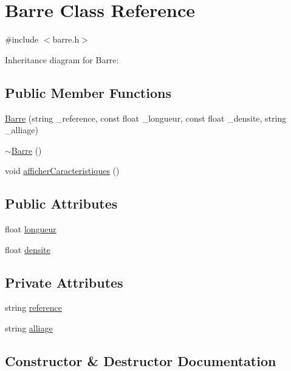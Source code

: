 \hypertarget{class_barre}{}\section{Barre Class Reference}
\label{class_barre}


{\ttfamily \#include $<$barre.\+h$>$}



Inheritance diagram for Barre\+:
\subsection*{Public Member Functions}
\begin{DoxyCompactItemize}
\item 
\hyperlink{class_barre_a0cc8d32d93eccf080627396297c3423d}{Barre} (string \+\_\+reference, const float \+\_\+longueur, const float \+\_\+densite, string \+\_\+alliage)
\item 
\hyperlink{class_barre_adc603c73952d56885cad1cc1acad578f}{$\sim$\+Barre} ()
\item 
void \hyperlink{class_barre_a015f96c966396c30e6ba46d57dc4eb86}{afficher\+Caracteristiques} ()
\end{DoxyCompactItemize}
\subsection*{Public Attributes}
\begin{DoxyCompactItemize}
\item 
float \hyperlink{class_barre_afbaf5adb5c517bb48c516764e5ff8d6a}{longueur}
\item 
float \hyperlink{class_barre_a1ed969f61782b23802f20ff7a5759f8d}{densite}
\end{DoxyCompactItemize}
\subsection*{Private Attributes}
\begin{DoxyCompactItemize}
\item 
string \hyperlink{class_barre_a787dda4b06eba9eac805fc67720d4a11}{reference}
\item 
string \hyperlink{class_barre_a563afd4a7499371c8ad33ac807fc4dbf}{alliage}
\end{DoxyCompactItemize}


\subsection{Constructor \& Destructor Documentation}
\mbox{\label{class_barre_a0cc8d32d93eccf080627396297c3423d}} 
